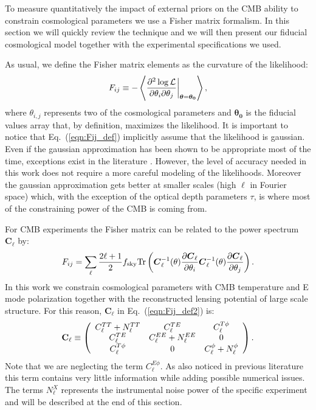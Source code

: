 \documentclass[aps,prd,reprint,superscriptaddress]{revtex4-1}
\newcommand\refeq[1]{Eq.~(\ref{eqn:#1})}
\begin{document}
To measure quantitatively the impact of external priors on the CMB ability to constrain cosmological parameters we use a Fisher matrix formalism. In this section we will quickly review  the technique and we will then present our fiducial cosmological model together with the experimental specifications we used.

As usual, we define the Fisher matrix elements as the curvature of the likelihood:
\begin{equation}
	\centering
		F_{ij} \equiv - \left\langle\frac{\partial^2 \log \mathcal{L}}{\partial \theta_i \partial \theta_j} \bigg|_{\boldsymbol{\theta} = \boldsymbol{\theta_0}}\right\rangle,
	\label{eqn:Fij_def}
\end{equation}
where $\theta_{i,j}$ represents two of the cosmological parameters and $\boldsymbol{\theta_0}$ is the fiducial values array that, by definition, maximizes the likelihood. It is important to notice that \refeq{Fij_def} implicitly assume that the likelihood is gaussian. Even if the gaussian approximation has been shown to be appropriate most of the time, exceptions exist in the literature \cite{2012JCAP...09..009W}. However, the level of accuracy needed in this work does not require a more careful modeling of the likelihoods. Moreover the gaussian approximation gets better at smaller scales (high $\ell$ in Fourier space) which, with the exception of the optical depth parameters $\tau$, is where most of the constraining power of the CMB is coming from.

For CMB experiments the Fisher matrix can be related to the power spectrum $\boldsymbol{C}_\ell$ by:
\begin{equation}
 F_{ij} = \sum_\ell \frac{2\ell+1}{2} f_{\rm sky} {\rm Tr} \left(  \boldsymbol{C}^{-1}_\ell( \theta) \frac{\partial \boldsymbol{C}_\ell}{\partial \theta_i} \boldsymbol{C}^{-1}_\ell( \theta) \frac{\partial \boldsymbol{C}_\ell}{\partial \theta_j}  \right).
 \label{eqn:Fij_def2}
 \end{equation}
In this work we constrain cosmological parameters with CMB temperature and E mode polarization together with the reconstructed lensing potential of large scale structure. For this reason, $\boldsymbol{C}_\ell$ in \refeq{Fij_def2} is:
 \begin{eqnarray}
 	\centering
		\mathbf{C}_\ell \equiv \left( \begin{array}{ccc}C_\ell^{TT} + N_\ell^{TT} & C_\ell^{TE} & C_\ell^{T\phi} \\ C_\ell^{TE} & C_\ell^{EE} + N_\ell^{EE} & 0 \\ C_\ell^{T\phi} & 0 & C_\ell^{\phi} + N_\ell^{\phi}\end{array}\right).
	\label{eqn:cov_definition}
\end{eqnarray}
Note that we are neglecting the term $C_\ell^{E\phi}$. As also noticed in previous literature \cite{wu:2014,2013PhRvD..87h3008H} this term contains very little information while adding possible numerical issues.
The terms $N_\ell^{X}$ represents the instrumental noise power of the specific experiment and will be described at the end of this section.
\end{document}
